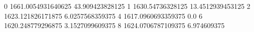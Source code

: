 0 1661.0054931640625 43.909423828125
1 1630.54736328125 13.4512939453125
2 1623.121826171875 6.0257568359375
4 1617.0960693359375 0.0
6 1620.248779296875 3.1527099609375
8 1624.0706787109375 6.974609375
